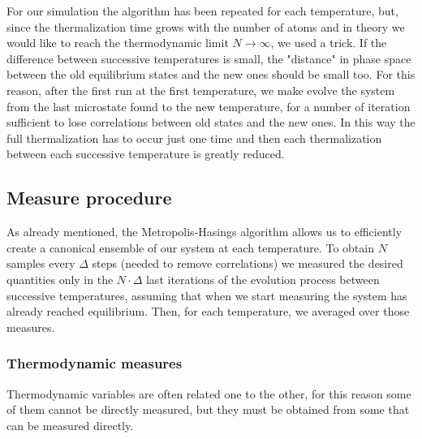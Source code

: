 For our simulation the algorithm has been repeated for each temperature, but, since the thermalization time grows with the number of atoms and in theory we would like to reach the thermodynamic limit $N\rightarrow\infty$, we used a trick. If the difference between successive temperatures is small, the "distance" in phase space between the old equilibrium states and the new ones should be small too. For this reason, after the first run at the first temperature, we make evolve the system from the last microstate found to the new temperature, for a number of iteration sufficient to lose correlations between old states and the new ones. In this way the full thermalization has to occur just one time and then each thermalization between each successive temperature is greatly reduced.

\subsection{Measure procedure}
As already mentioned, the Metropolis-Hasings algorithm allows us to efficiently create a canonical ensemble of our system at each temperature. To obtain $N$ samples every $\Delta$ steps (needed to remove correlations) we measured the desired quantities only in the $N\cdot \Delta$ last iterations of the evolution process between successive temperatures, assuming that when we start measuring the system has already reached equilibrium. Then, for each temperature, we averaged over those measures.
\subsubsection{Thermodynamic measures}
Thermodynamic variables are often related one to the other, for this reason some of them cannot be directly measured, but they must be obtained from some that can be measured directly.

